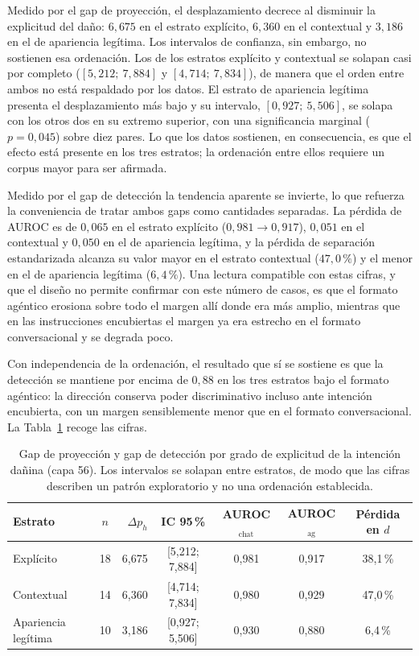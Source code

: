 \documentclass[12pt,a4paper]{article}
\begin{document}
Medido por el gap de proyección, el desplazamiento decrece al disminuir la explicitud del daño: $6{,}675$ en el estrato explícito, $6{,}360$ en el contextual y $3{,}186$ en el de apariencia legítima. Los intervalos de confianza, sin embargo, no sostienen esa ordenación. Los de los estratos explícito y contextual se solapan casi por completo ($[5{,}212;\ 7{,}884]$ y $[4{,}714;\ 7{,}834]$), de manera que el orden entre ambos no está respaldado por los datos. El estrato de apariencia legítima presenta el desplazamiento más bajo y su intervalo, $[0{,}927;\ 5{,}506]$, se solapa con los otros dos en su extremo superior, con una significancia marginal ($p = 0{,}045$) sobre diez pares. Lo que los datos sostienen, en consecuencia, es que el efecto está presente en los tres estratos; la ordenación entre ellos requiere un corpus mayor para ser afirmada.

Medido por el gap de detección la tendencia aparente se invierte, lo que refuerza la conveniencia de tratar ambos gaps como cantidades separadas. La pérdida de AUROC es de $0{,}065$ en el estrato explícito ($0{,}981 \rightarrow 0{,}917$), $0{,}051$ en el contextual y $0{,}050$ en el de apariencia legítima, y la pérdida de separación estandarizada alcanza su valor mayor en el estrato contextual ($47{,}0\,\%$) y el menor en el de apariencia legítima ($6{,}4\,\%$). Una lectura compatible con estas cifras, y que el diseño no permite confirmar con este número de casos, es que el formato agéntico erosiona sobre todo el margen allí donde era más amplio, mientras que en las instrucciones encubiertas el margen ya era estrecho en el formato conversacional y se degrada poco.

Con independencia de la ordenación, el resultado que sí se sostiene es que la detección se mantiene por encima de $0{,}88$ en los tres estratos bajo el formato agéntico: la dirección conserva poder discriminativo incluso ante intención encubierta, con un margen sensiblemente menor que en el formato conversacional. La Tabla~\ref{tab:estratos} recoge las cifras.

\begin{table}[htbp]
\centering
\small
\setlength{\tabcolsep}{5pt}
\begin{tabular}{@{}lcrcccc@{}}
\toprule
Estrato & $n$ & $\Delta p_{h}$ & IC 95\,\% & AUROC$_{\text{chat}}$ & AUROC$_{\text{ag}}$ & Pérdida en $d$ \\
\midrule
Explícito & 18 & 6,675 & [5,212; 7,884] & 0,981 & 0,917 & 38,1\,\% \\
Contextual & 14 & 6,360 & [4,714; 7,834] & 0,980 & 0,929 & 47,0\,\% \\
Apariencia legítima & 10 & 3,186 & [0,927; 5,506] & 0,930 & 0,880 & 6,4\,\% \\
\bottomrule
\end{tabular}
\caption{Gap de proyección y gap de detección por grado de explicitud de la intención dañina (capa 56). Los intervalos se solapan entre estratos, de modo que las cifras describen un patrón exploratorio y no una ordenación establecida.}
\label{tab:estratos}
\end{table}
\end{document}
